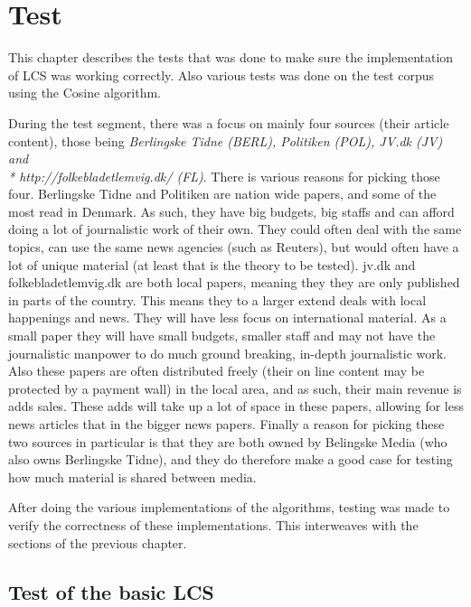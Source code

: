 \chapter{Test}

This chapter describes the tests that was done to make sure the implementation of LCS was working correctly. Also various tests was done on the test corpus using the Cosine algorithm. 

During the test segment, there was a focus on mainly four sources (their article content), those being \textit{Berlingske Tidne (BERL), Politiken (POL), JV.dk (JV) and \\* http://folkebladetlemvig.dk/ (FL)}. There is various reasons for picking those four. Berlingske Tidne and Politiken are nation wide papers, and some of the most read in Denmark. As such, they have big budgets, big staffs and can afford doing a lot of journalistic work of their own. They could often deal with the same topics, can use the same news agencies (such as Reuters), but would often have a lot of unique material (at least that is the theory to be tested). jv.dk and folkebladetlemvig.dk are both local papers, meaning they they are only published in parts of the country. This means they to a larger extend deals with local happenings and news. They will have less focus on international material. As a small paper they will have small budgets, smaller staff and may not have the journalistic manpower to do much ground breaking, in-depth journalistic work. Also these papers are often distributed freely (their on line content may be protected by a payment wall) in the local area, and as such, their main revenue is adds sales. These adds will take up a lot of space in these papers, allowing for less news articles that in the bigger news papers. Finally a reason for picking these two sources in particular is that they are both owned by Belingske Media (who also owns Berlingske Tidne), and they do therefore make a good case for testing how much material is shared between media.

After doing the various implementations of the algorithms, testing was made to verify the correctness of these implementations. This interweaves with the sections of the previous chapter.

\section{Test of the basic LCS}

